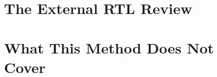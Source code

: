 \section{The External RTL Review}
\label{sec:rtl-review}

\section{What This Method Does Not Cover}
\label{sec:verification-limits}
